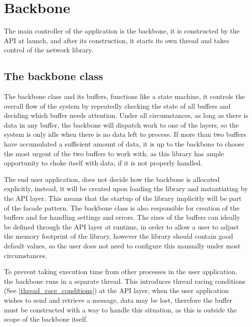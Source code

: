 \chapter{Backbone}\label{chap:backbone}
The main controller of the application is the backbone, it is constructed by the API at launch, and after its construction, it starts its own thread and takes control of the network library.

\section{The backbone class}
The backbone class and its buffers, functions like a state machine, it controls the overall flow of the system by repeatedly checking the state of all buffers and deciding which buffer needs attention. Under all circumstances, as long as there is data in any buffer, the backbone will dispatch work to one of the layers, so the system is only idle when there is no data left to process.
If more than two buffers have accumulated a sufficient amount of data, it is up to the backbone to choose the most urgent of the two buffers to work with, as this library has ample opportunity to choke itself with data, if it is not properly handled.

The end user application, does not decide how the backbone is allocated explicitly, instead, it will be created upon loading the library and instantiating by the API layer. This means that the startup of the library implicitly will be part of the facade pattern.
The backbone class is also responsible for creation of the buffers and for handling settings and errors. 
The sizes of the buffers can ideally be defined through the API layer at runtime, in order to allow a user to adjust the memory footprint of the library, 
however the library should contain good default values, so the user does not need to configure this manually under most circumstances.

To prevent taking execution time from other processes in the user application, the backbone runs in a separate thread. This introduces thread racing conditions  (See \ref{thread_race_conditions}) at the API layer, when the user application wishes to send and retrieve a message, data may be lost, therefore the buffer must be constructed with a way to handle this situation, as this is outside the scope of the backbone itself.


